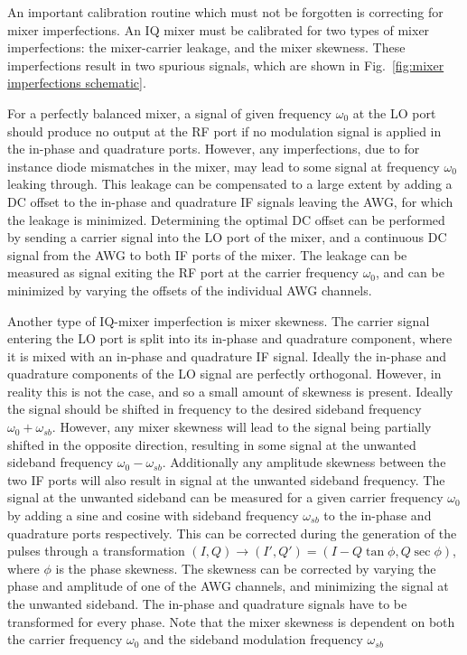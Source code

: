         An important calibration routine which must not be forgotten is correcting for mixer imperfections. An IQ mixer must be calibrated for two types of mixer imperfections: the mixer-carrier leakage, and the mixer skewness. These imperfections result in two spurious signals, which are shown in Fig.~\ref{fig:mixer imperfections schematic}.

        For a perfectly balanced mixer, a signal of given frequency $\omega_0$ at the LO port should produce no output at the RF port if no modulation signal is applied in the in-phase and quadrature ports.  However, any imperfections, due to for instance diode mismatches in the mixer, may lead to some signal at frequency $\omega_0$ leaking through. This leakage can be compensated to a large extent by adding a DC offset to the in-phase and quadrature IF signals leaving the AWG, for which the leakage is minimized. Determining the optimal DC offset can be performed by sending a carrier signal into the LO port of the mixer, and a continuous DC signal from the AWG to both IF ports of the mixer. The leakage can be measured as signal exiting the RF port at the carrier frequency $\omega_0$, and can be minimized by varying the offsets of the individual AWG channels.

        Another type of IQ-mixer imperfection is mixer skewness. The carrier signal entering the LO port is split into its in-phase and quadrature component, where it is mixed with an in-phase and quadrature IF signal. Ideally the in-phase and quadrature components of the LO signal are perfectly orthogonal. However, in reality this is not the case, and so a small amount of skewness is present. Ideally the signal should be shifted in frequency to the desired sideband frequency $\omega_0 + \omega_{sb}$. However, any mixer skewness will lead to the signal being partially shifted in the opposite direction, resulting in some signal at the unwanted sideband frequency $\omega_0 - \omega_{sb}$. Additionally any amplitude skewness between the two IF ports will also result in signal at the unwanted sideband frequency. The signal at the unwanted sideband can be measured for a given carrier frequency $\omega_0$ by adding a sine and cosine with sideband frequency $\omega_{sb}$ to the in-phase and quadrature ports respectively.   This can be corrected during the generation of the pulses through a transformation $\left( I, Q \right) \rightarrow \left( I', Q' \right) = \left( I - Q \tan{\phi}, Q \sec{\phi} \right)$, where $\phi$ is the phase skewness. The skewness can be corrected by varying the phase and amplitude of one of the AWG channels, and minimizing the signal at the unwanted sideband. The in-phase and quadrature signals have to be transformed for every phase. Note that the mixer skewness is dependent on both the carrier frequency $\omega_0$ and the sideband modulation frequency $\omega_{sb}$

